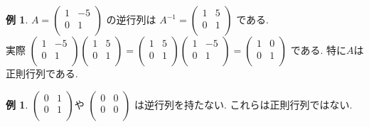 \documentclass[dvipdfmx,a4paper,11pt]{article}
\theoremstyle{definition}
\newtheorem{exa}[thm]{例}
\begin{document}
 \begin{exa}
 $A=
  \begin{pmatrix}
 1& -5  \\
 0& 1  \\
 \end{pmatrix} 
 $
 の逆行列は
  $A^{-1}=
  \begin{pmatrix}
 1& 5  \\
 0& 1  \\
 \end{pmatrix} 
 $
 である. \\ 
 実際
  $
  \begin{pmatrix}
 1& -5  \\
 0& 1  \\
 \end{pmatrix} 
  \begin{pmatrix}
 1& 5  \\
 0& 1  \\
 \end{pmatrix} 
=
  \begin{pmatrix}
 1& 5  \\
 0& 1  \\
 \end{pmatrix} 
   \begin{pmatrix}
 1& -5  \\
 0& 1  \\
 \end{pmatrix} 
 =
   \begin{pmatrix}
 1& 0 \\
 0& 1  \\
 \end{pmatrix} 
 $
 である.
 特に$A$は正則行列である. 
 \end{exa}

 
   \begin{exa}
  $
  \begin{pmatrix}
 0& 1 \\
 0& 1  \\
 \end{pmatrix} 
 $や  
 $
  \begin{pmatrix}
 0&0 \\
 0&0\\
 \end{pmatrix} 
 $
  は逆行列を持たない. これらは正則行列ではない.
  \end{exa}
  
\end{document}
